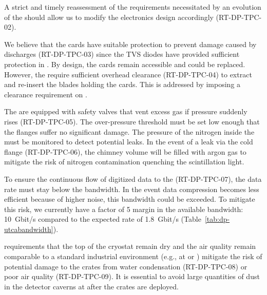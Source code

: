 A strict and timely reassessment of the  requirements necessitated by an evolution of the \dual {} should allow us to modify the   electronics design accordingly (RT-DP-TPC-02).

We believe that the  cards have suitable protection to prevent damage caused by  discharges (RT-DP-TPC-03) since the  TVS diodes have provided sufficient protection in . By design, the  cards remain accessible and could be replaced. However, the  require sufficient overhead clearance (RT-DP-TPC-04) to extract and re-insert the blades holding the  cards. This is addressed by imposing a clearance requirement on .

The  are equipped with safety valves that vent excess gas if pressure suddenly rises (RT-DP-TPC-05). The over-pressure threshold must be set low enough that the flanges suffer no significant damage. The pressure of the nitrogen inside the  must be monitored to detect potential leaks. In the event of a leak via the cold flange (RT-DP-TPC-06), the chimney volume will be filled with argon gas to mitigate the risk of nitrogen contamination quenching the scintillation light.  

To ensure the continuous flow of digitized data to the  (RT-DP-TPC-07), the data rate must stay below the  bandwidth. In the event data compression becomes less efficient because of higher noise, this bandwidth could be exceeded. To mitigate this risk, we currently have a factor of \num{5} margin in the available bandwidth: \SI{10}{Gbit/s}  compared to the expected rate of \SI{1.8}{Gbit/s} (Table~\ref{tab:dp-utcabandwidth}).

 requirements that the top of the cryostat remain dry and the air quality remain comparable to a standard industrial environment (e.g., at  or ) mitigate the risk of potential damage to the  crates from water condensation (RT-DP-TPC-08) or poor air quality (RT-DP-TPC-09). It is essential to avoid large quantities of dust in the detector caverns at  after the  crates are deployed.
